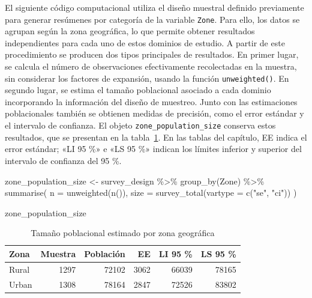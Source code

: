 \documentclass[
  spanish,
  11pt,
  letterpaper,
  oneside,
  open=any]{scrbook}
\newenvironment{Shaded}{\begin{snugshade}}{\end{snugshade}}
\newcommand{\AttributeTok}[1]{\textcolor[rgb]{0.40,0.45,0.13}{#1}}
\newcommand{\FunctionTok}[1]{\textcolor[rgb]{0.28,0.35,0.67}{#1}}
\newcommand{\NormalTok}[1]{\textcolor[rgb]{0.00,0.23,0.31}{#1}}
\newcommand{\OtherTok}[1]{\textcolor[rgb]{0.00,0.23,0.31}{#1}}
\newcommand{\SpecialCharTok}[1]{\textcolor[rgb]{0.37,0.37,0.37}{#1}}
\newcommand{\StringTok}[1]{\textcolor[rgb]{0.13,0.47,0.30}{#1}}
\begin{document}
El siguiente código computacional utiliza el diseño muestral definido
previamente para generar resúmenes por categoría de la variable
\texttt{Zone}. Para ello, los datos se agrupan según la zona geográfica,
lo que permite obtener resultados independientes para cada uno de estos
dominios de estudio. A partir de este procedimiento se producen dos
tipos principales de resultados. En primer lugar, se calcula el número
de observaciones efectivamente recolectadas en la muestra, sin
considerar los factores de expansión, usando la función
\texttt{unweighted()}. En segundo lugar, se estima el tamaño poblacional
asociado a cada dominio incorporando la información del diseño de
muestreo. Junto con las estimaciones poblacionales también se obtienen
medidas de precisión, como el error estándar y el intervalo de
confianza. El objeto \texttt{zone\_population\_size} conserva estos
resultados, que se presentan en la tabla~\ref{tbl-tamano-zona}. En las
tablas del capítulo, EE indica el error estándar; «LI 95 \%» e «LS 95
\%» indican los límites inferior y superior del intervalo de confianza
del 95 \%.

\begin{Shaded}
\begin{Highlighting}[]
\NormalTok{zone\_population\_size }\OtherTok{\textless{}{-}}\NormalTok{ survey\_design }\SpecialCharTok{\%\textgreater{}\%}
  \FunctionTok{group\_by}\NormalTok{(Zone) }\SpecialCharTok{\%\textgreater{}\%}
  \FunctionTok{summarise}\NormalTok{(}
    \AttributeTok{n =} \FunctionTok{unweighted}\NormalTok{(}\FunctionTok{n}\NormalTok{()),}
    \AttributeTok{size =} \FunctionTok{survey\_total}\NormalTok{(}\AttributeTok{vartype =} \FunctionTok{c}\NormalTok{(}\StringTok{"se"}\NormalTok{, }\StringTok{"ci"}\NormalTok{))}
\NormalTok{  )}

\NormalTok{zone\_population\_size}
\end{Highlighting}
\end{Shaded}

{

\begin{longtable}[]{@{}lrrrrr@{}}

\caption{\label{tbl-tamano-zona}Tamaño poblacional estimado por zona
geográfica}

\tabularnewline

\toprule\noalign{}
Zona & Muestra & Población & EE & LI 95 \% & LS 95 \% \\
\midrule\noalign{}
\endhead
\bottomrule\noalign{}
\endlastfoot
Rural & 1297 & 72102 & 3062 & 66039 & 78165 \\
Urban & 1308 & 78164 & 2847 & 72526 & 83802 \\

\end{longtable}

}
\end{document}
